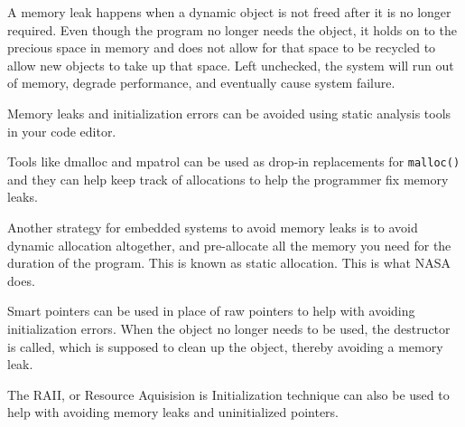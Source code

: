 A memory leak happens when a dynamic object is not freed after it is no longer
required. Even though the program no longer needs the object, it holds on to the
precious space in memory and does not allow for that space to be recycled to
allow new objects to take up that space. Left unchecked, the system will run out
of memory, degrade performance, and eventually cause system failure.

Memory leaks and initialization errors can be avoided using static analysis
tools in your code editor. 

Tools like dmalloc and mpatrol can be used as drop-in
replacements for \texttt{malloc()} and they can help keep track of allocations
to help the programmer fix memory leaks. 

Another strategy for embedded systems to avoid memory leaks is to avoid dynamic
allocation altogether, and pre-allocate all the memory you need for the duration
of the program. This is known as static allocation. This is what NASA does.

Smart pointers can be used in place of raw pointers to help with avoiding
initialization errors. When the object no longer needs to be used, the
destructor is called, which is supposed to clean up the object, thereby avoiding
a memory leak. 

The RAII, or Resource Aquisision is Initialization technique can also be used to
help with avoiding memory leaks and uninitialized pointers.
